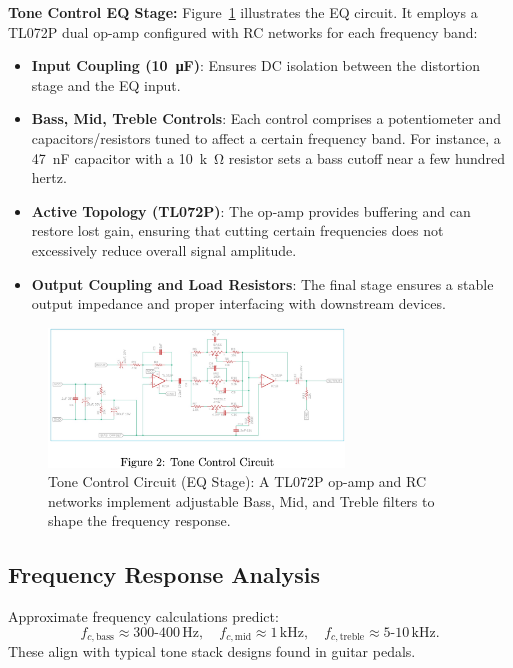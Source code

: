\documentclass[12pt,a4paper]{article}
\begin{document}
\textbf{Tone Control EQ Stage:}  
Figure~\ref{fig:tonecontrol} illustrates the EQ circuit. It employs a TL072P dual op-amp configured with RC networks for each frequency band:
\begin{itemize}
    \item \textbf{Input Coupling (\SI{10}{\micro\farad})}: Ensures DC isolation between the distortion stage and the EQ input.
    \item \textbf{Bass, Mid, Treble Controls}: Each control comprises a potentiometer and capacitors/resistors tuned to affect a certain frequency band. For instance, a \SI{47}{nF} capacitor with a \SI{10}{k\ohm} resistor sets a bass cutoff near a few hundred hertz.
    \item \textbf{Active Topology (TL072P)}: The op-amp provides buffering and can restore lost gain, ensuring that cutting certain frequencies does not excessively reduce overall signal amplitude.
    \item \textbf{Output Coupling and Load Resistors}: The final stage ensures a stable output impedance and proper interfacing with downstream devices.
\end{itemize}

\begin{figure}[h!]
\centering
\includegraphics[width=0.7\textwidth]{img/tone_control_circuit.png}
\caption{Tone Control Circuit (EQ Stage): A TL072P op-amp and RC networks implement adjustable Bass, Mid, and Treble filters to shape the frequency response.}
\label{fig:tonecontrol}
\end{figure}

\subsection{Frequency Response Analysis}
Approximate frequency calculations predict:
\[
f_{c,\text{bass}} \approx 300\text{-}400\,\text{Hz}, \quad
f_{c,\text{mid}} \approx 1\,\text{kHz}, \quad
f_{c,\text{treble}} \approx 5\text{-}10\,\text{kHz}.
\]
These align with typical tone stack designs found in guitar pedals.
\end{document}
